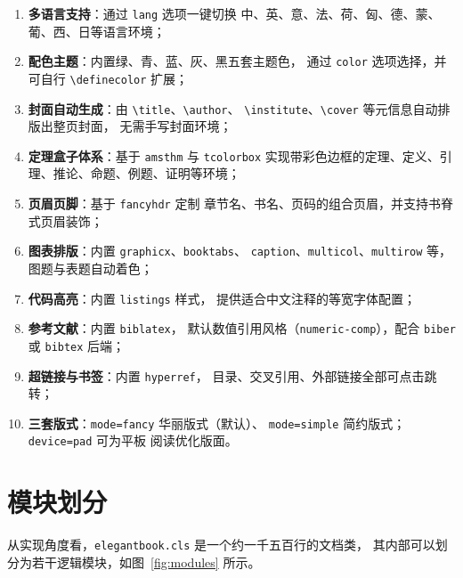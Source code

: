 \begin{enumerate}
  \item \textbf{多语言支持}：通过 \texttt{lang} 选项一键切换
        中、英、意、法、荷、匈、德、蒙、葡、西、日等语言环境；
  \item \textbf{配色主题}：内置绿、青、蓝、灰、黑五套主题色，
        通过 \texttt{color} 选项选择，并可自行 \verb|\definecolor| 扩展；
  \item \textbf{封面自动生成}：由 \verb|\title|、\verb|\author|、
        \verb|\institute|、\verb|\cover| 等元信息自动排版出整页封面，
        无需手写封面环境；
  \item \textbf{定理盒子体系}：基于 \texttt{amsthm} 与 \texttt{tcolorbox}
        实现带彩色边框的定理、定义、引理、推论、命题、例题、证明等环境；
  \item \textbf{页眉页脚}：基于 \texttt{fancyhdr} 定制
        章节名、书名、页码的组合页眉，并支持书脊式页眉装饰；
  \item \textbf{图表排版}：内置 \texttt{graphicx}、\texttt{booktabs}、
        \texttt{caption}、\texttt{multicol}、\texttt{multirow} 等，
        图题与表题自动着色；
  \item \textbf{代码高亮}：内置 \texttt{listings} 样式，
        提供适合中文注释的等宽字体配置；
  \item \textbf{参考文献}：内置 \texttt{biblatex}，
        默认数值引用风格（\texttt{numeric-comp}），配合 \texttt{biber}
        或 \texttt{bibtex} 后端；
  \item \textbf{超链接与书签}：内置 \texttt{hyperref}，
        目录、交叉引用、外部链接全部可点击跳转；
  \item \textbf{三套版式}：\texttt{mode=fancy} 华丽版式（默认）、
        \texttt{mode=simple} 简约版式；\texttt{device=pad} 可为平板
        阅读优化版面。
\end{enumerate}

\section{模块划分}

从实现角度看，\texttt{elegantbook.cls} 是一个约一千五百行的文档类，
其内部可以划分为若干逻辑模块，如图~\ref{fig:modules} 所示。

